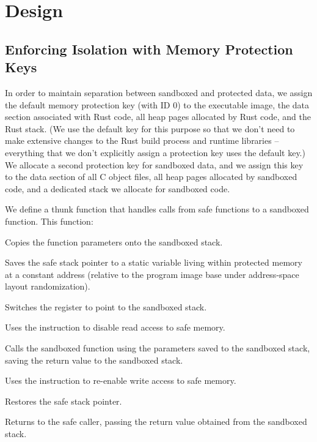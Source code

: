 \chapter{Design}
\section{Enforcing Isolation with Memory Protection Keys}

In order to maintain separation between sandboxed and protected data, we assign the default memory
protection key (with ID 0) to the executable image, the data section associated with Rust code, all
heap pages allocated by Rust code, and the Rust stack. (We use the default key for this purpose so
that we don't need to make extensive changes to the Rust build process and runtime libraries --
everything that we don't explicitly assign a protection key uses the default key.) We allocate a
second protection key for sandboxed data, and we assign this key to the data section of all C object
files, all heap pages allocated by sandboxed code, and a dedicated stack we allocate for sandboxed
code.

We define a thunk function that handles calls from safe functions to a sandboxed function. This
function:

\squishlist
    \item Copies the function parameters onto the sandboxed stack.
    \item Saves the safe stack pointer to a static variable living within protected memory at a constant
        address (relative to the program image base under address-space layout randomization).
    \item Switches the  register to point to the sandboxed stack.
    \item Uses the  instruction to disable read access to safe memory.
    \item Calls the sandboxed function using the parameters saved to the sandboxed stack, saving the
        return value to the sandboxed stack.
    \item Uses the  instruction to re-enable write access to safe memory.
    \item Restores the safe stack pointer.
    \item Returns to the safe caller, passing the return value obtained from the sandboxed stack.
\squishend

